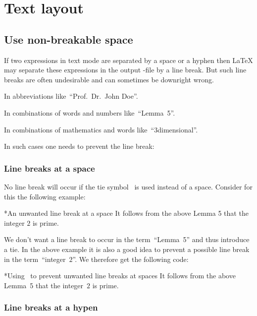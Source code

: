 \section{Text layout}



\subsection{Use non-breakable space}
\label{non-breakable space}

If two expressions in text mode are separated by a space or a hyphen then {\LaTeX} may separate these expressions in the output -file by a line break.
But such line breaks are often undesirable and can sometimes be downright wrong.
\begin{myitemize}
  \item
    In abbreviations like~\enquote{Prof.~Dr.~John Doe}.
  \item
    In combinations of words and numbers like~\enquote{Lemma~5}.
  \item
    In combinations of mathematics and words like~\enquote{$3${\nbd}dimensional}.
\end{myitemize}
In such cases one needs to prevent the line break:

\subsubsection{Line breaks at a space}

No line break will occur if the tie\index{\customtexttilde} symbol~\inlinecode{\customtexttilde} is used instead of a space.
Consider for this the following example:
\begin{showlatex}*{An unwanted line break at a space}
It follows from the above Lemma 5 that the integer $2$ is prime.
\end{showlatex}
We don’t want a line break to occur in the term~\enquote{Lemma~5} and thus introduce a tie.
In the above example it is also a good idea to prevent a possible line break in the term~\enquote{integer~$2$}.
We therefore get the following code:
\begin{showlatex}*{Using~\inlinecode{\customtexttilde} to prevent unwanted line breaks at spaces}
It follows from the above Lemma~5 that the integer~$2$ is prime.
\end{showlatex}

\subsubsection{Line breaks at a hypen}

